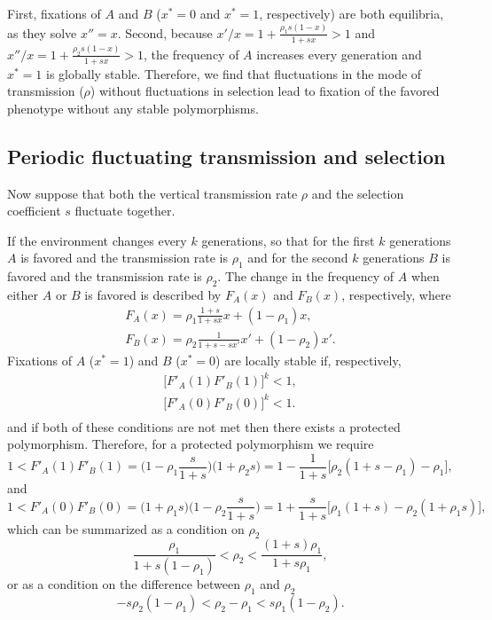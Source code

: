 \documentclass[12pt]{extarticle} %
\begin{document}
First, fixations of $A$ and $B$ ($x^*=0$ and $x^*=1$, respectively) are both equilibria, as they solve $x''=x$.
Second, because $x'/x = 1+\frac{\rho_1 s (1-x)}{1+sx} > 1$ and $x''/x = 1+\frac{\rho_2 s (1-x)}{1+sx} > 1$, the frequency of $A$ increases every generation and $x^*=1$ is globally stable.
Therefore, we find that fluctuations in the mode of transmission ($\rho$) without fluctuations in selection lead to fixation of the favored phenotype without any stable polymorphisms.

\subsection*{Periodic fluctuating transmission and selection}

Now suppose that both the vertical transmission rate $\rho$ and the selection coefficient $s$ fluctuate together.

If the environment changes every $k$ generations, so that for the first $k$ generations $A$ is favored and the transmission rate is $\rho_1$ and for the second $k$ generations $B$ is favored and the transmission rate is $\rho_2$.
The change in the frequency of $A$ when either $A$ or $B$ is favored is described by $F_A(x)$ and $F_B(x)$, respectively, where
\begin{equation}\begin{aligned} \label{eq:recurrence_periodic_fluc}
F_A(x) = \rho_1 \frac{1+s}{1+sx} x + (1-\rho_1)x, \\
F_B(x) = \rho_2 \frac{1}{1+s-sx'} x' + (1-\rho_2)x'.
\end{aligned}\end{equation}
Fixations of $A$ ($x^*=1$) and $B$ ($x^*=0$) are locally stable if, respectively,
\begin{equation}\begin{aligned}
\big[F'_A(1) F'_B(1)\big]^k < 1, \\
\big[F'_A(0) F'_B(0)\big]^k < 1. \\
\end{aligned}\end{equation}
and if both of these conditions are not met then there exists a protected polymorphism.
Therefore, for a protected polymorphism we require
\begin{equation}
1 < F'_A(1) F'_B(1) = \Big(1-\rho_1\frac{s}{1+s}\Big)\Big(1+\rho_2 s\Big) 
= 1-\frac{1}{1+s}\big[\rho_2(1+s-\rho_1)-\rho_1\big],
\end{equation}
and
\begin{equation}
1 < F'_A(0) F'_B(0) = \Big(1+\rho_1 s\Big)\Big(1-\rho_2 \frac{s}{1+s}\Big) 
= 1+\frac{s}{1+s}\big[\rho_1(1+s) -\rho_2(1+\rho_1 s)\big],
\end{equation}
which can be summarized as a condition on $\rho_2$
\begin{equation} \label{eq:poly_condition_periodic_fluc}
\frac{\rho_1}{1+s(1-\rho_1)} < \rho_2 < \frac{(1+s)\rho_1}{1+s\rho_1},
\end{equation}
or as a condition on the difference between $\rho_1$ and $\rho_2$
\begin{equation}
-s\rho_2(1-\rho_1) < \rho_2 - \rho_1 < s\rho_1(1-\rho_2).
\end{equation}
\end{document}

